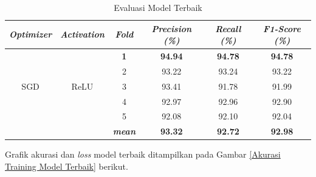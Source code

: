 \begin{table}[H]
    \begin{table}[H]
        \centering
        \caption{Evaluasi Model Terbaik}
        \begin{tabular}{cccccc}
            \toprule
            \textbf{\textit{Optimizer}} & \textbf{\textit{Activation}} &
            \multicolumn{1}{c}{\textit{\textbf{Fold}}} & \textbf{\textit{Precision (\%) } } & \textbf{\textit{Recall (\%)}} & \textbf{\textit{F1-Score (\%)}}\\
        
            \midrule
            \multirow{5}{*}{SGD} & \multirow{5}{*}{ReLU} 
            & \textbf{ 1 }& \textbf{94.94} & \textbf{94.78} & \textbf{94.78} \\
            & & 2 & 93.22 & 93.24 & 93.22 \\
            & & 3 & 93.41 & 91.78 & 91.99 \\
            & & 4 & 92.97 & 92.96 & 92.90 \\
            & & 5 & 92.08 & 92.10 & 92.04  \\
            & &\multirow{1}{*}{\textit{\textbf{mean}}} & \textbf{93.32} & \textbf{92.72} &\textbf{92.98} \\ 

            
            \bottomrule
        \end{tabular}
        \label{Evaluasi Model Terbaik}
    \end{table}


    Grafik akurasi dan \textit{loss} model terbaik ditampilkan pada Gambar \ref{Akurasi Training Model Terbaik} berikut. 



\end{table}
